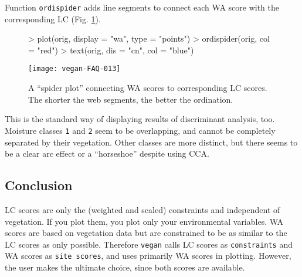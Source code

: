 \documentclass[a4paper]{article}
\begin{document}
Function \texttt{ordispider} adds line segments to connect each WA
score with the corresponding LC (Fig.  \ref{fig:walcspider}).
\begin{figure}
\begin{center}
\begin{Schunk}
\begin{Sinput}
> plot(orig, display = "wa", type = "points")
> ordispider(orig, col = "red")
> text(orig, dis = "cn", col = "blue")
\end{Sinput}
\end{Schunk}
\texttt{[image: vegan-FAQ-013]}
\caption{A ``spider plot'' connecting WA scores to corresponding LC
  scores. The shorter the web segments, the better the ordination.}
\label{fig:walcspider}
\end{center}
\end{figure}
This is the standard way of displaying results of discriminant
analysis, too.  Moisture classes \texttt{1} and \texttt{2} seem to be
overlapping, and cannot be completely separated by their
vegetation. Other classes are more distinct, but there seems to be a
clear arc effect or a ``horseshoe'' despite using CCA.

\subsection{Conclusion}

LC scores are only the (weighted and scaled) constraints and
independent of vegetation. If you plot them, you plot only your
environmental variables. WA scores are based on vegetation data but
are constrained to be as similar to the LC scores as only
possible. Therefore \texttt{vegan} calls LC scores as
\texttt{constraints} and WA scores as \texttt{site scores}, and uses
primarily WA scores in plotting.  However, the user makes the ultimate
choice, since both scores are available.




\end{document}
